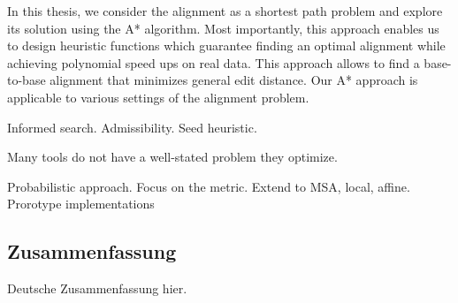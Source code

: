 In this thesis, we consider the alignment as a shortest path problem and explore
its solution using the A* algorithm. Most importantly, this approach enables us
to design heuristic functions which guarantee finding an optimal alignment while
achieving polynomial speed ups on real data. This approach allows to find a
base-to-base alignment that minimizes general edit distance. Our A* approach is
applicable to various settings of the alignment problem.

Informed search. Admissibility. Seed heuristic.

Many tools do not have a well-stated problem they optimize.

Probabilistic approach.
Focus on the metric.
Extend to MSA, local, affine.
Prorotype implementations

\endgroup

\cleardoublepage%

\begingroup
\let\clearpage\relax
\let\cleardoublepage\relax
\let\cleardoublepage\relax

\begin{otherlanguage}{ngerman}
\chapter*{Zusammenfassung}

Deutsche Zusammenfassung hier.

\end{otherlanguage}

\endgroup

\vfill